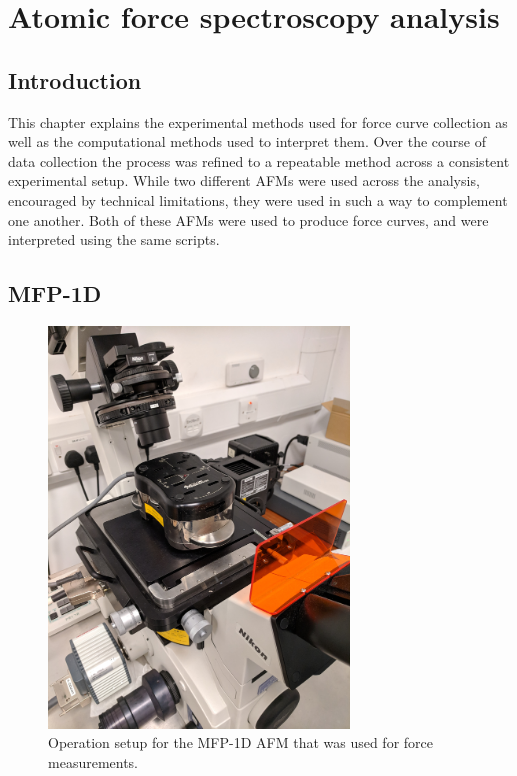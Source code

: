 



\chapter{Atomic force spectroscopy analysis}

\section{Introduction}

This chapter explains the experimental methods used for force curve collection as well as the computational methods used to interpret them. Over the course of data collection the process was refined to a repeatable method across a consistent experimental setup. While two different AFMs were used across the analysis, encouraged by technical limitations, they were used in such a way to complement one another. Both of these AFMs were used to produce force curves, and were interpreted using the same scripts.

\section{MFP-1D} %

\begin{figure}[h!]     
        \begin{center}
          \includegraphics[width=80mm]{chapter2/forceAFM.jpg}
\end{center}
\caption{Operation setup for the MFP-1D AFM that was used for force measurements.}
\label{fig:forceAFM.jpg}                 
\end{figure}

